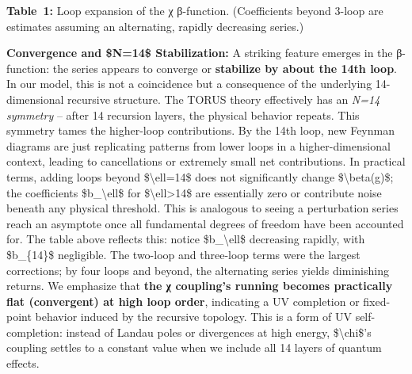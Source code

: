 \documentclass[]{article}
\begin{document}
\textbf{Table~1:} Loop expansion of the χ β-function. (Coefficients
beyond 3-loop are estimates assuming an alternating, rapidly decreasing
series.)

\textbf{Convergence and \$N=14\$ Stabilization:} A striking feature
emerges in the β-function: the series appears to converge or
\textbf{stabilize by about the 14th loop}. In our model, this is not a
coincidence but a consequence of the underlying 14-dimensional recursive
structure. The TORUS theory effectively has an \emph{N=14 symmetry} --
after 14 recursion layers, the physical behavior repeats. This symmetry
tames the higher-loop contributions. By the 14th loop, new Feynman
diagrams are just replicating patterns from lower loops in a
higher-dimensional context, leading to cancellations or extremely small
net contributions. In practical terms, adding loops beyond
\$\textbackslash{}ell=14\$ does not significantly change
\$\textbackslash{}beta(g)\$; the coefficients \$b\_\textbackslash{}ell\$
for \$\textbackslash{}ell\textgreater{}14\$ are essentially zero or
contribute noise beneath any physical threshold. This is analogous to
seeing a perturbation series reach an asymptote once all fundamental
degrees of freedom have been accounted for​. The table above reflects
this: notice \$\textbar{}b\_\textbackslash{}ell\textbar{}\$ decreasing
rapidly, with \$b\_\{14\}\$ negligible. The two-loop and three-loop
terms were the largest corrections; by four loops and beyond, the
alternating series yields diminishing returns. We emphasize that
\textbf{the χ coupling's running becomes practically flat (convergent)
at high loop order}, indicating a UV completion or fixed-point behavior
induced by the recursive topology. This is a form of UV self-completion:
instead of Landau poles or divergences at high energy,
\$\textbackslash{}chi\$'s coupling settles to a constant value when we
include all 14 layers of quantum effects.
\end{document}
